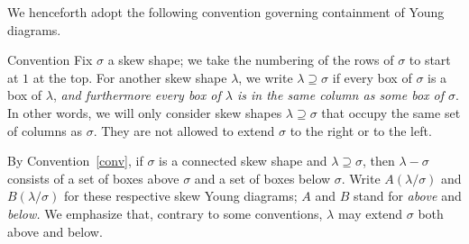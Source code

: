 We henceforth adopt the following convention governing containment of Young diagrams. 
\begin{enonce}{Convention}\label{conv}
Fix $\sigma$ a skew shape; we take the numbering of the rows of $\sigma$ to start at $1$ at the top. For another skew shape $\lambda$, we write $\lambda \supseteq \sigma$ if every box of $\sigma$ is a box of $\lambda$, \emph{and furthermore every box of $\lambda$ is in the same column as some box of $\sigma$}. In other words, we will only consider skew shapes $\lambda\supseteq \sigma$ that occupy the same set of columns as $\sigma$. They are not allowed to extend $\sigma$ to the right or to the left.
\end{enonce}

By Convention~\ref{conv}, if $\sigma$ is a connected skew shape and $\lambda\supseteq \sigma$, then $\lambda - \sigma$ consists of a set of boxes above $\sigma$ and a set of boxes below $\sigma$. Write $A(\lambda/\sigma)$ and $B(\lambda/\sigma)$ for these respective skew Young diagrams; $A$ and $B$ stand for \emph{above} and \emph{below.} We emphasize that, contrary to some conventions, $\lambda$ may extend $\sigma$ both above and below.



